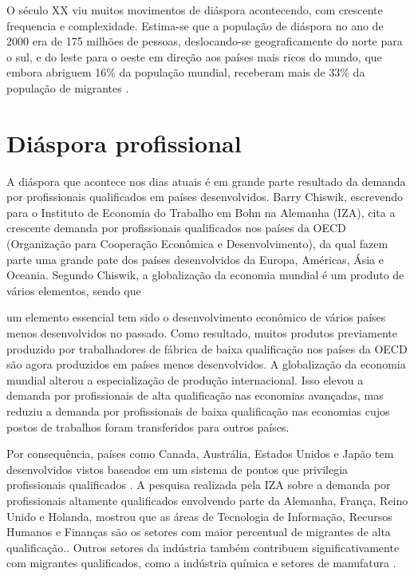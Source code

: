\documentclass[
	12pt,				%
	openright,			%
	twoside,			%
	a4paper,			%
	english,			%
	french,				%
	spanish,			%
	brazil				%
	]{abntex2}
\begin{document}
O século XX viu muitos movimentos de diáspora acontecendo, com crescente frequencia e complexidade. Estima-se que a população de diáspora no ano de 2000 era de 175 milhões de pessoas, deslocando-se geograficamente do norte para o sul, e do leste para o oeste em direção aos países mais ricos do mundo, que embora abriguem 16\% da população mundial, receberam mais de 33\% da população de migrantes \cite[26]{wan_diaspora_2011}.

\section{Diáspora profissional}

A diáspora que acontece nos dias atuais é em grande parte resultado da demanda por profissionais qualificados em países desenvolvidos. Barry Chiswik, escrevendo para o Instituto de Economia do Trabalho em Bohn na Alemanha (IZA), cita a crescente demanda por profissionais qualificados nos países da OECD (Organização para Cooperação Econômica e Desenvolvimento), da qual fazem parte uma grande pate dos países desenvolvidos da Europa, Américas, Ásia e Oceania. Segundo Chiswik, a globalização da economia mundial é um produto de vários elementos, sendo que \begin{citacao} um elemento essencial tem sido o desenvolvimento econômico de vários países menos desenvolvidos no passado. Como resultado, muitos produtos previamente produzido por trabalhadores de fábrica de baixa qualificação nos países da OECD são agora produzidos em países menos desenvolvidos. A globalização da economia mundial alterou a especialização de produção internacional. Isso elevou a demanda por profissionais de alta qualificação nas economias avançadas, mas reduziu a demanda por profissionais de baixa qualificação nas economias cujos postos de trabalhos foram transferidos para outros países. \end{citacao}\cite[3]{chiswick_high_2005}

Por consequência, países como Canada, Austrália, Estados Unidos e Japão tem desenvolvidos vistos baseados em um sistema de pontos que privilegia profissionais qualificados \cite[6]{chiswick_high_2005}. A pesquisa realizada pela IZA sobre a demanda por profissionais altamente qualificados envolvendo parte da Alemanha, França, Reino Unido e Holanda, mostrou que as áreas de Tecnologia de Informação,  Recursos Humanos e Finanças são os setores com maior percentual de migrantes de alta qualificação.\cite[7]{bauer_demand_2004}. Outros setores da indústria também contribuem significativamente com migrantes qualificados, como a indústria química e setores de manufatura \cite[18]{bauer_demand_2004}.
\end{document}
